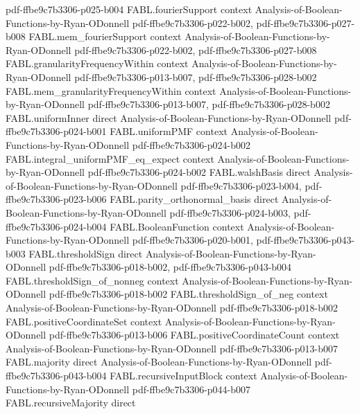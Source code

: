 \begin{theorem}
  {pdf-ffbe9c7b3306-p025-b004}
\proofstep
  {FABL.fourierSupport}
  {context}
  {Analysis-of-Boolean-Functions-by-Ryan-ODonnell}
  {pdf-ffbe9c7b3306-p022-b002,
    pdf-ffbe9c7b3306-p027-b008}
\proofstep
  {FABL.mem_fourierSupport}
  {context}
  {Analysis-of-Boolean-Functions-by-Ryan-ODonnell}
  {pdf-ffbe9c7b3306-p022-b002,
    pdf-ffbe9c7b3306-p027-b008}
\proofstep
  {FABL.granularityFrequencyWithin}
  {context}
  {Analysis-of-Boolean-Functions-by-Ryan-ODonnell}
  {pdf-ffbe9c7b3306-p013-b007,
    pdf-ffbe9c7b3306-p028-b002}
\proofstep
  {FABL.mem_granularityFrequencyWithin}
  {context}
  {Analysis-of-Boolean-Functions-by-Ryan-ODonnell}
  {pdf-ffbe9c7b3306-p013-b007,
    pdf-ffbe9c7b3306-p028-b002}
\proofstep
  {FABL.uniformInner}
  {direct}
  {Analysis-of-Boolean-Functions-by-Ryan-ODonnell}
  {pdf-ffbe9c7b3306-p024-b001}
\proofstep
  {FABL.uniformPMF}
  {context}
  {Analysis-of-Boolean-Functions-by-Ryan-ODonnell}
  {pdf-ffbe9c7b3306-p024-b002}
\proofstep
  {FABL.integral_uniformPMF_eq_expect}
  {context}
  {Analysis-of-Boolean-Functions-by-Ryan-ODonnell}
  {pdf-ffbe9c7b3306-p024-b002}
\proofstep
  {FABL.walshBasis}
  {direct}
  {Analysis-of-Boolean-Functions-by-Ryan-ODonnell}
  {pdf-ffbe9c7b3306-p023-b004,
    pdf-ffbe9c7b3306-p023-b006}
\proofstep
  {FABL.parity_orthonormal_basis}
  {direct}
  {Analysis-of-Boolean-Functions-by-Ryan-ODonnell}
  {pdf-ffbe9c7b3306-p024-b003,
    pdf-ffbe9c7b3306-p024-b004}
\proofstep
  {FABL.BooleanFunction}
  {context}
  {Analysis-of-Boolean-Functions-by-Ryan-ODonnell}
  {pdf-ffbe9c7b3306-p020-b001,
    pdf-ffbe9c7b3306-p043-b003}
\proofstep
  {FABL.thresholdSign}
  {direct}
  {Analysis-of-Boolean-Functions-by-Ryan-ODonnell}
  {pdf-ffbe9c7b3306-p018-b002,
    pdf-ffbe9c7b3306-p043-b004}
\proofstep
  {FABL.thresholdSign_of_nonneg}
  {context}
  {Analysis-of-Boolean-Functions-by-Ryan-ODonnell}
  {pdf-ffbe9c7b3306-p018-b002}
\proofstep
  {FABL.thresholdSign_of_neg}
  {context}
  {Analysis-of-Boolean-Functions-by-Ryan-ODonnell}
  {pdf-ffbe9c7b3306-p018-b002}
\proofstep
  {FABL.positiveCoordinateSet}
  {context}
  {Analysis-of-Boolean-Functions-by-Ryan-ODonnell}
  {pdf-ffbe9c7b3306-p013-b006}
\proofstep
  {FABL.positiveCoordinateCount}
  {context}
  {Analysis-of-Boolean-Functions-by-Ryan-ODonnell}
  {pdf-ffbe9c7b3306-p013-b007}
\proofstep
  {FABL.majority}
  {direct}
  {Analysis-of-Boolean-Functions-by-Ryan-ODonnell}
  {pdf-ffbe9c7b3306-p043-b004}
\proofstep
  {FABL.recursiveInputBlock}
  {context}
  {Analysis-of-Boolean-Functions-by-Ryan-ODonnell}
  {pdf-ffbe9c7b3306-p044-b007}
\proofstep
  {FABL.recursiveMajority}
  {direct}

\end{theorem}
